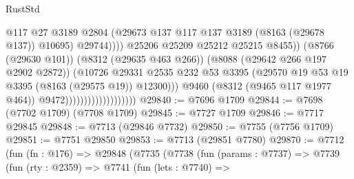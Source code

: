\begin{lexlean}{RustStd}
\begin{coremodule}
                                                        @117
                                                        @27
                                                        @3189
                                                        @2804
                                                        (@29673
                                                          @137
                                                          @117
                                                          @137
                                                          @3189
                                                          (@8163 (@29678 @137))
                                                          @10695)
                                                        @29744))))
                                                @25206
                                                @25209
                                                @25212
                                                @25215
                                                @8455))
                                            (@8766 (@29630 @101))
                                            (@8312 (@29635 @463 @266))
                                            (@8088 (@29642 @266 @197 @2902 @2872))
                                            (@10726
                                              @29331
                                              @2535
                                              @232
                                              @53
                                              @3395
                                              (@29570
                                                @19
                                                @53
                                                @19
                                                @3395
                                                (@8163 (@29575 @19))
                                                @12300)))
                                          @9460
                                          (@8312 (@9465 @117 @1977 @464))
                                          @9472)))))))))))))))))))
@29840 := @7696 @1709
@29844 := @7698 (@7702 @1709) (@7708 @1709)
@29845 := @7727 @1709
@29846 := @7717 @29845
@29848 := @7713 (@29846 @7732)
@29850 := @7755 (@7756 @1709)
@29851 := @7751 @29850
@29853 := @7713 (@29851 @7780)
@29870 := @7712
    (fun (fn : @176) =>
    @29848
      (@7735
        (@7738
          (fun (params : @7737) =>
          @7739
            (fun (rty : @2359) =>
            @7741
              (fun (lets : @7740) =>

\end{coremodule}
\end{lexlean}
